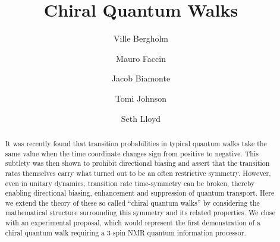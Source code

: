 \documentclass[aps,pra,12pt,nofootinbib,superscriptaddress,longbibliography,showpacs]{revtex4-1}
\theoremstyle{plain}
\theoremstyle{definition}
\begin{document}

\title{Chiral Quantum Walks}

\author{Ville Bergholm}

\author{Mauro Faccin}

\author{Jacob Biamonte}

\author{Tomi Johnson}


\author{Seth Lloyd}



\begin{abstract}
It was recently found that transition probabilities in typical quantum
walks take the same value when the time
coordinate changes sign from positive to negative.  This subtlety was
then shown to prohibit directional biasing and assert that the
transition rates themselves carry what turned out to be an often
restrictive symmetry.  However, even in unitary dynamics, transition
rate time-symmetry can be broken, thereby enabling directional
biasing, enhancement and suppression of quantum transport.  Here we
extend the theory of these so called ``chiral quantum walks'' by
considering the mathematical structure surrounding this symmetry and
its related properties.  We close with an experimental proposal, which
would represent the first demonstration of a chiral quantum walk
requiring a 3-spin NMR quantum information processor.
\end{abstract} 


\maketitle
\end{document}
